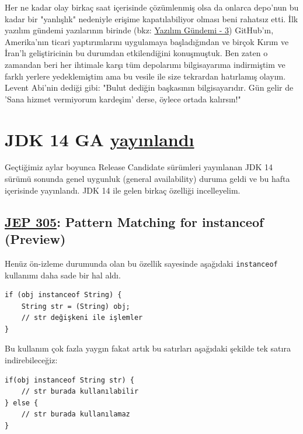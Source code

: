 \documentclass[11pt]{article}
\begin{document}
Her ne kadar olay birkaç saat içerisinde çözümlenmiş olsa da onlarca depo'nun
bu kadar bir "yanlışlık" nedeniyle erişime kapatılabiliyor olması beni rahatsız
etti. İlk yazılım gündemi yazılarının birinde (bkz: \href{../../2019/03/yazilim-gundemi-03.pdf}{Yazılım Gündemi - 3})
GitHub'ın, Amerika'nın ticari yaptırımlarını uygulamaya başladığından ve birçok
Kırım ve İran'lı geliştiricinin bu durumdan etkilendiğini konuşmuştuk. Ben
zaten o zamandan beri her ihtimale karşı tüm depolarımı bilgisayarıma
indirmiştim ve farklı yerlere yedeklemiştim ama bu vesile ile size tekrardan
hatırlamış olayım. Levent Abi'nin dediği gibi: "Bulut dediğin başkasının
bilgisayarıdır. Gün gelir de 'Sana hizmet vermiyorum kardeşim' derse, öylece
ortada kalırsın!"
\section{JDK 14 GA \href{https://jdk.java.net/14/}{yayınlandı}}
\label{sec:org667c6b5}
Geçtiğimiz aylar boyunca Release Candidate sürümleri yayınlanan JDK 14 sürümü
sonunda genel uygunluk (general availability) duruma geldi ve bu hafta
içerisinde yayınlandı. JDK 14 ile gelen birkaç özelliği incelleyelim.

\subsection{\href{https://openjdk.java.net/jeps/305}{JEP 305}: Pattern Matching for instanceof (Preview)}
\label{sec:org79a0b06}
Henüz ön-izleme durumunda olan bu özellik sayesinde aşağıdaki \texttt{instanceof}
kullanımı daha sade bir hal aldı.

\begin{verbatim}
if (obj instanceof String) {
    String str = (String) obj;
    // str değişkeni ile işlemler
}
\end{verbatim}
Bu kullanım çok fazla yaygın fakat artık bu satırları aşağıdaki şekilde tek
satıra indirebileceğiz:
\begin{verbatim}
if(obj instanceof String str) {
    // str burada kullanılabilir
} else {
    // str burada kullanılamaz
}
\end{verbatim}
\end{document}

